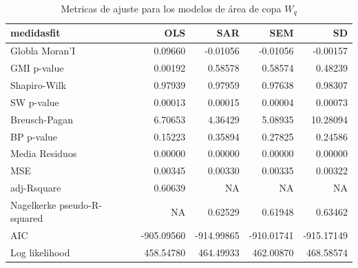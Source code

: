 \documentclass[12pt,a4paper,openany]{book}
\theoremstyle{definition}
\theoremstyle{definition}
\theoremstyle{definition}
\theoremstyle{remark}
\begin{document}
\begin{table}[t]

\caption{\label{tab:tabla-comp-modelos-copa-wq}Metricas de ajuste para los modelos de área de copa $W_q$}
\centering
\begin{tabular}{lrrrr}
\toprule
medidasfit & OLS & SAR & SEM & SD\\
\midrule
Globla Moran'I & 0.09660 & -0.01056 & -0.01056 & -0.00157\\
GMI p-value & 0.00192 & 0.58578 & 0.58574 & 0.48239\\
Shapiro-Wilk & 0.97939 & 0.97959 & 0.97638 & 0.98307\\
SW p-value & 0.00013 & 0.00015 & 0.00004 & 0.00073\\
Breusch-Pagan & 6.70653 & 4.36429 & 5.08935 & 10.28094\\
\addlinespace
BP p-value & 0.15223 & 0.35894 & 0.27825 & 0.24586\\
Media Residuos & 0.00000 & 0.00000 & 0.00000 & 0.00000\\
MSE & 0.00345 & 0.00330 & 0.00335 & 0.00322\\
adj-Rsquare & 0.60639 & NA & NA & NA\\
Nagelkerke pseudo-R-squared & NA & 0.62529 & 0.61948 & 0.63462\\
\addlinespace
AIC & -905.09560 & -914.99865 & -910.01741 & -915.17149\\
Log likelihood & 458.54780 & 464.49933 & 462.00870 & 468.58574\\
\bottomrule
\end{tabular}
\end{table}
\end{document}
